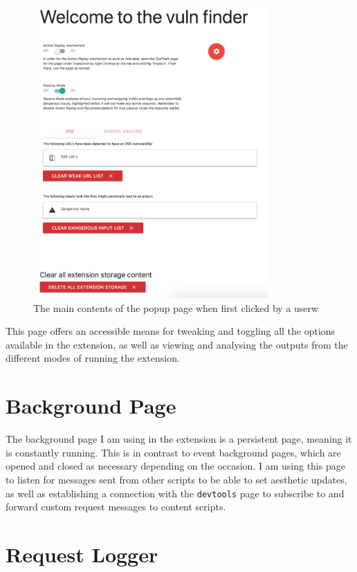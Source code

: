 \begin{figure}[h!]
	\centering
	\includegraphics[width=0.8\textwidth]{images/popup_full.png}
	\caption{The main contents of the popup page when first clicked by a userw}
	\label{fig:test}
\end{figure}

This page offers an accessible means for tweaking and toggling all the options available in the extension, as well as viewing and analysing the outputs from the different modes of running the extension.  


\section{Background Page}

The background page I am using in the extension is a persistent page, meaning it is constantly running. This is in contrast to event background pages, which are opened and closed as necessary depending on the occasion. I am using this page to listen for messages sent from other scripts to be able to set aesthetic updates, as well as establishing a connection with the \texttt{devtools} page to subscribe to and forward custom request messages to content scripts.

\section{Request Logger}

